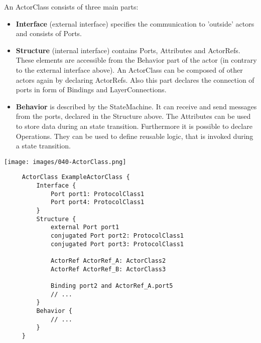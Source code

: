 	An ActorClass consists of three main parts:
	\begin{itemize}
	\item \textbf{Interface} (external interface) specifies the communication to 'outside' actors and consists of Ports.
	\item \textbf{Structure} (internal interface) contains Ports, Attributes and ActorRefs. These elements are accessible from the Behavior part of the actor (in contrary to the external interface above). An ActorClass can be composed of other actors again by declaring ActorRefs. Also this part declares the connection of ports in form of Bindings and LayerConnections.
	\item \textbf{Behavior} is described by the StateMachine. It can receive and send messages from the ports, declared in the Structure above. The Attributes can be used to store data during an state transition. Furthermore it is possible to declare Operations. They can be used to define reusable logic, that is invoked during a state transition.
	\end{itemize}	
	
	\texttt{[image: images/040-ActorClass.png]}
	\begin{lstlisting}
	 ActorClass ExampleActorClass {
		 Interface {
			 Port port1: ProtocolClass1
			 Port port4: ProtocolClass1
		 }
		 Structure {
			 external Port port1
			 conjugated Port port2: ProtocolClass1
			 conjugated Port port3: ProtocolClass1
			 
			 ActorRef ActorRef_A: ActorClass2
			 ActorRef ActorRef_B: ActorClass3
			 
			 Binding port2 and ActorRef_A.port5
			 // ...
		 }
		 Behavior {
			 // ...
		 }
	 }
	 \end{lstlisting}
		
